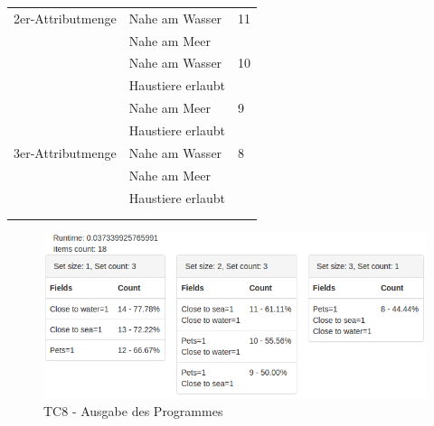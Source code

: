 \begin{table}[H]
\begin{tabular}{ | l | l | l | }
		2er-Attributmenge & \tabitem Nahe am Wasser & 11 \\
		& \tabitem Nahe am Meer & \\ \cline{2-3} 
		& \tabitem Nahe am Wasser & 10 \\
		& \tabitem Haustiere erlaubt & \\ \cline{2-3} 
		& \tabitem Nahe am Meer & 9 \\
		& \tabitem Haustiere erlaubt & \\ \hline
		
		3er-Attributmenge & \tabitem Nahe am Wasser & 8 \\
		& \tabitem Nahe am Meer & \\ 
		& \tabitem Haustiere erlaubt & \\ \hline
		
		\rowcolor{tableheadcolor}
		\multicolumn{3}{|l|}{\bfseries Testergebnis} \\ \hline 
		\multicolumn{3}{|l|}{\cellcolor{green!25}} \\ \hline 
	\end{tabular}
\end{table}
\begin{figure}[H]
	\RawFloats
	\centering
	\includegraphics[width=1\textwidth]{images/tc8.png}
	\caption{TC8 - Ausgabe des Programmes}
	\label{fig:testingfazit:testing:testcases:8-1}
\end{figure}
